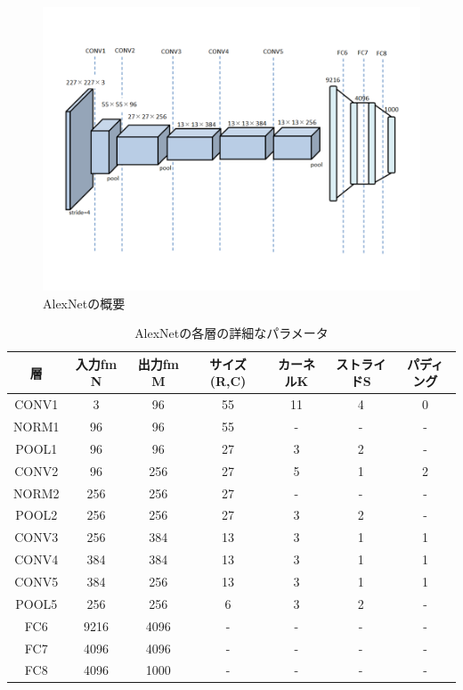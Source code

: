 \begin{figure}[ht]  
 \begin{center}   
	\includegraphics[width=1.0\columnwidth,bb=0 0 720 540]{img/imagenet.png}
    \caption{AlexNet\cite{alexnet}の概要}
  \label{imagenet_img}  
 \end{center}  
\end{figure}

\begin{table}[ht]
 \begin{center}
  \caption{AlexNetの各層の詳細なパラメータ}
   \begin{tabular}{|c|c|c|c|c|c|c|} \hline
     層 & 入力fm N & 出力fm M & サイズ(R,C) & カーネルK & ストライドS & パディング \\ \hline
     CONV1 & 3 & 96 & 55 & 11 & 4 & 0 \\
     NORM1 & 96 & 96 & 55 & - & - & - \\
     POOL1 & 96 & 96 & 27 & 3 & 2 & - \\
     CONV2 & 96 & 256 & 27 & 5 & 1 & 2 \\
     NORM2 & 256 & 256 & 27 & - & - & - \\
     POOL2 & 256 & 256 & 27 & 3 & 2 & - \\
     CONV3 & 256 & 384 & 13 & 3 & 1 & 1\\
     CONV4 & 384 & 384 & 13 & 3 & 1 & 1\\
     CONV5 & 384 & 256 & 13 & 3 & 1 & 1\\
     POOL5 & 256 & 256 & 6 & 3 & 2 & - \\
     FC6 & 9216 & 4096 & - & - & - & - \\
     FC7 & 4096 & 4096 & - & - & - & - \\
     FC8 & 4096 & 1000 & - & - & - & - \\ \hline
  \end{tabular}
  \label{imagenet}  
 \end{center}
\end{table}
